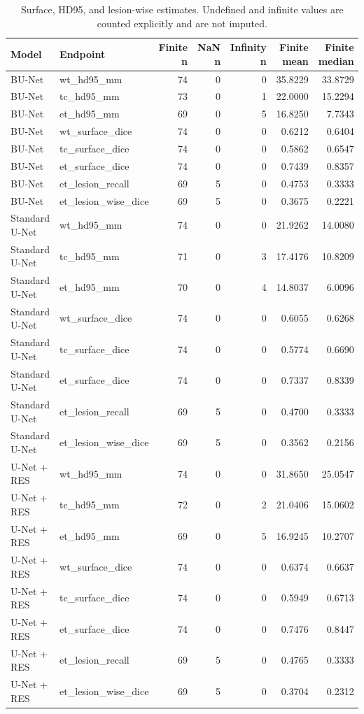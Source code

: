 \begin{table}[htbp]
\caption{Surface, HD95, and lesion-wise estimates. Undefined and infinite values are counted explicitly and are not imputed.}
\label{tab:table05_secondary_metrics}
\begin{tabular}{llrrrrr}
\toprule
Model & Endpoint & Finite n & NaN n & Infinity n & Finite mean & Finite median \\
\midrule
BU-Net & wt\_hd95\_mm & 74 & 0 & 0 & 35.8229 & 33.8729 \\
BU-Net & tc\_hd95\_mm & 73 & 0 & 1 & 22.0000 & 15.2294 \\
BU-Net & et\_hd95\_mm & 69 & 0 & 5 & 16.8250 & 7.7343 \\
BU-Net & wt\_surface\_dice & 74 & 0 & 0 & 0.6212 & 0.6404 \\
BU-Net & tc\_surface\_dice & 74 & 0 & 0 & 0.5862 & 0.6547 \\
BU-Net & et\_surface\_dice & 74 & 0 & 0 & 0.7439 & 0.8357 \\
BU-Net & et\_lesion\_recall & 69 & 5 & 0 & 0.4753 & 0.3333 \\
BU-Net & et\_lesion\_wise\_dice & 69 & 5 & 0 & 0.3675 & 0.2221 \\
Standard U-Net & wt\_hd95\_mm & 74 & 0 & 0 & 21.9262 & 14.0080 \\
Standard U-Net & tc\_hd95\_mm & 71 & 0 & 3 & 17.4176 & 10.8209 \\
Standard U-Net & et\_hd95\_mm & 70 & 0 & 4 & 14.8037 & 6.0096 \\
Standard U-Net & wt\_surface\_dice & 74 & 0 & 0 & 0.6055 & 0.6268 \\
Standard U-Net & tc\_surface\_dice & 74 & 0 & 0 & 0.5774 & 0.6690 \\
Standard U-Net & et\_surface\_dice & 74 & 0 & 0 & 0.7337 & 0.8339 \\
Standard U-Net & et\_lesion\_recall & 69 & 5 & 0 & 0.4700 & 0.3333 \\
Standard U-Net & et\_lesion\_wise\_dice & 69 & 5 & 0 & 0.3562 & 0.2156 \\
U-Net + RES & wt\_hd95\_mm & 74 & 0 & 0 & 31.8650 & 25.0547 \\
U-Net + RES & tc\_hd95\_mm & 72 & 0 & 2 & 21.0406 & 15.0602 \\
U-Net + RES & et\_hd95\_mm & 69 & 0 & 5 & 16.9245 & 10.2707 \\
U-Net + RES & wt\_surface\_dice & 74 & 0 & 0 & 0.6374 & 0.6637 \\
U-Net + RES & tc\_surface\_dice & 74 & 0 & 0 & 0.5949 & 0.6713 \\
U-Net + RES & et\_surface\_dice & 74 & 0 & 0 & 0.7476 & 0.8447 \\
U-Net + RES & et\_lesion\_recall & 69 & 5 & 0 & 0.4765 & 0.3333 \\
U-Net + RES & et\_lesion\_wise\_dice & 69 & 5 & 0 & 0.3704 & 0.2312 \\
\bottomrule
\end{tabular}
\end{table}
